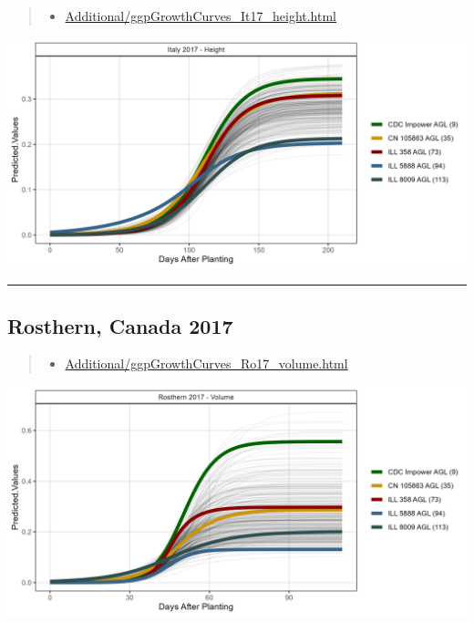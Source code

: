 \documentclass[
]{article}
\providecommand{\tightlist}{%
  \setlength{\itemsep}{0pt}\setlength{\parskip}{0pt}}
\begin{document}
\begin{quote}
\begin{itemize}
\tightlist
\item
  \href{https://derekmichaelwright.github.io/AGILE_LDP_UAV/Additional/ggpGrowthCurves_It17_height.html}{Additional/ggpGrowthCurves\_It17\_height.html}
\end{itemize}
\end{quote}

\includegraphics{Additional/ggGrowthCurves_It17_height.png}

\begin{center}\rule{0.5\linewidth}{0.5pt}\end{center}

\subsection{Rosthern, Canada 2017}\label{rosthern-canada-2017}

\begin{quote}
\begin{itemize}
\tightlist
\item
  \href{https://derekmichaelwright.github.io/AGILE_LDP_UAV/Additional/ggpGrowthCurves_Ro17_volume.html}{Additional/ggpGrowthCurves\_Ro17\_volume.html}
\end{itemize}
\end{quote}

\includegraphics{Additional/ggGrowthCurves_Ro17_volume.png}
\end{document}
